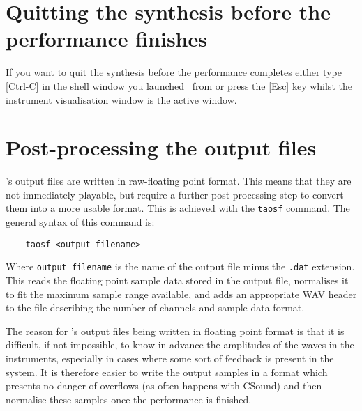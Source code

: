 \section{Quitting the synthesis before the performance finishes}
If you want to quit the synthesis before the performance completes
either type [Ctrl-C] in the shell window you launched \tao\ from or
press the [Esc] key whilst the instrument visualisation window is the
active window.

\section{Post-processing the output files}
\label{section:output_files}
\tao's output files are written in raw-floating point format. This means
that they are not immediately playable, but require a further
post-processing step to convert them into a more usable format. This
is achieved with the \verb|taosf| command. The general syntax of this
command is:

\begin{verbatim}
    taosf <output_filename>
\end{verbatim}

Where \verb|output_filename| is the name of the output file minus the
\verb|.dat| extension. This reads the floating point sample data stored
in the output file, normalises it to fit the maximum sample range
available, and adds an appropriate WAV header to the file describing
the number of channels and sample data format.

The reason for \tao's output files being written in floating point
format is that it is difficult, if not impossible, to know in advance
the amplitudes of the waves in the instruments, especially in cases
where some sort of feedback is present in the system. It is therefore
easier to write the output samples in a format which presents no danger
of overflows (as often happens with CSound) and then normalise these
samples once the performance is finished.

